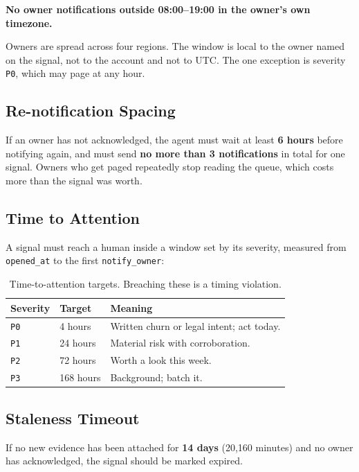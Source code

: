 \documentclass[11pt, a4paper]{article}
\begin{document}
\textbf{No owner notifications outside 08:00--19:00 in the owner's own timezone.}

Owners are spread across four regions. The window is local to the owner named on the signal, not to the account and not to UTC. The one exception is severity \texttt{P0}, which may page at any hour.

\subsection{Re-notification Spacing}

If an owner has not acknowledged, the agent must wait at least \textbf{6 hours} before notifying again, and must send \textbf{no more than 3 notifications} in total for one signal. Owners who get paged repeatedly stop reading the queue, which costs more than the signal was worth.

\subsection{Time to Attention}

A signal must reach a human inside a window set by its severity, measured from \texttt{opened\_at} to the first \texttt{notify\_owner}:

\begin{table}[h]
\centering
\begin{tabular}{lll}
\toprule
\textbf{Severity} & \textbf{Target} & \textbf{Meaning} \\
\midrule
\texttt{P0} & 4 hours & Written churn or legal intent; act today. \\
\texttt{P1} & 24 hours & Material risk with corroboration. \\
\texttt{P2} & 72 hours & Worth a look this week. \\
\texttt{P3} & 168 hours & Background; batch it. \\
\bottomrule
\end{tabular}
\caption{Time-to-attention targets. Breaching these is a timing violation.}
\end{table}

\subsection{Staleness Timeout}

If no new evidence has been attached for \textbf{14 days} (20,160 minutes) and no owner has acknowledged, the signal should be marked expired.
\end{document}
